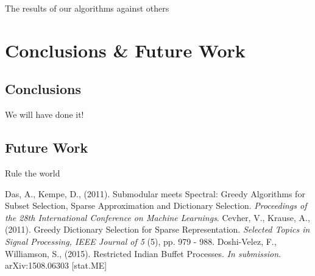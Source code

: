 \documentclass{article}
\begin{document}
The results of our algorithms against others

\section{Conclusions \& Future Work}
\subsection{Conclusions}
We will have done it!
 
\subsection{Future Work}
Rule the world 

\begin{thebibliography}{99}
  Das, A., Kempe, D., (2011). Submodular meets Spectral: Greedy Algorithms for Subset Selection, Sparse Approximation and Dictionary Selection. \textit{Proceedings of the 28th International Conference on Machine Learnings}.
  Cevher, V., Krause, A., (2011). Greedy Dictionary Selection for Sparse Representation. \textit{Selected Topics in Signal Processing, IEEE Journal of 5} (5), pp. 979 - 988.
  Doshi-Velez, F., Williamson, S., (2015). Restricted Indian Buffet Processes. \textit{In submission}. arXiv:1508.06303 [stat.ME]
  
\end{thebibliography}
\end{document}
